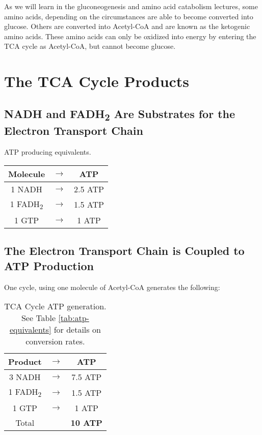 \documentclass{tufte-handout}
\begin{document}
  As we will learn in the gluconeogenesis and amino acid catabolism lectures, some amino acids, depending on the circumstances are able to become converted into glucose.  Others are converted into Acetyl-CoA and are known as the ketogenic amino acids.  These amino acids can only be oxidized into energy by entering the TCA cycle as Acetyl-CoA, but cannot become glucose.

\section{The TCA Cycle Products}

\subsection{NADH and FADH\textsubscript{2} Are Substrates for the Electron Transport Chain}

\begin{margintable}
\centering
\caption{ATP producing equivalents.}
\label{tab:atp-equivalents}
\begin{tabular}{ccc}
\hline
\textbf {Molecule} & $\rightarrow$ & \textbf{ATP}\\
\hline
1 NADH & $\rightarrow$ & 2.5 ATP \\
1 FADH\textsubscript{2} & $\rightarrow$ &  1.5 ATP  \\
1 GTP & $\rightarrow$ &  1 ATP  \\
\hline
\end{tabular}
\end{margintable}

\subsection{The Electron Transport Chain is Coupled to ATP Production}

  One cycle, using one molecule of Acetyl-CoA generates the following:

\begin{table}
\centering
\caption{TCA Cycle ATP generation.  See Table \ref{tab:atp-equivalents} for details on conversion rates.}
\label{tab:atp-tca}
\begin{tabular}{ccc}
\hline
\textbf {Product} & $\rightarrow$ & \textbf{ATP}\\
\hline
3 NADH & $\rightarrow$ & 7.5 ATP \\
1 FADH\textsubscript{2} & $\rightarrow$ &  1.5 ATP  \\
1 GTP & $\rightarrow$ &  1 ATP  \\
\hline
Total & & \textbf{10 ATP}\\
\end{tabular}
\end{table}
\end{document}
